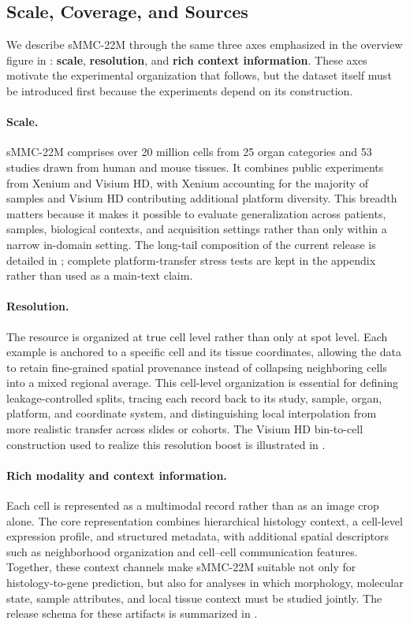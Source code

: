\documentclass{article}
\newcommand{\dataset}{sMMC-22M\xspace}
\begin{document}
\subsection{Scale, Coverage, and Sources}
We describe \dataset through the same three axes emphasized in the overview figure in : \textbf{scale}, \textbf{resolution}, and \textbf{rich context information}. These axes motivate the experimental organization that follows, but the dataset itself must be introduced first because the experiments depend on its construction.

\paragraph{Scale.}
\dataset comprises over 20 million cells from 25 organ categories and 53 studies drawn from human and mouse tissues. It combines public experiments from Xenium and Visium HD, with Xenium accounting for the majority of samples and Visium HD contributing additional platform diversity. This breadth matters because it makes it possible to evaluate generalization across patients, samples, biological contexts, and acquisition settings rather than only within a narrow in-domain setting. The long-tail composition of the current release is detailed in ; complete platform-transfer stress tests are kept in the appendix rather than used as a main-text claim.

\paragraph{Resolution.}
The resource is organized at true cell level rather than only at spot level. Each example is anchored to a specific cell and its tissue coordinates, allowing the data to retain fine-grained spatial provenance instead of collapsing neighboring cells into a mixed regional average. This cell-level organization is essential for defining leakage-controlled splits, tracing each record back to its study, sample, organ, platform, and coordinate system, and distinguishing local interpolation from more realistic transfer across slides or cohorts. The Visium HD bin-to-cell construction used to realize this resolution boost is illustrated in .

\paragraph{Rich modality and context information.}
Each cell is represented as a multimodal record rather than as an image crop alone. The core representation combines hierarchical histology context, a cell-level expression profile, and structured metadata, with additional spatial descriptors such as neighborhood organization and cell--cell communication features. Together, these context channels make \dataset suitable not only for histology-to-gene prediction, but also for analyses in which morphology, molecular state, sample attributes, and local tissue context must be studied jointly. The release schema for these artifacts is summarized in .
\end{document}
